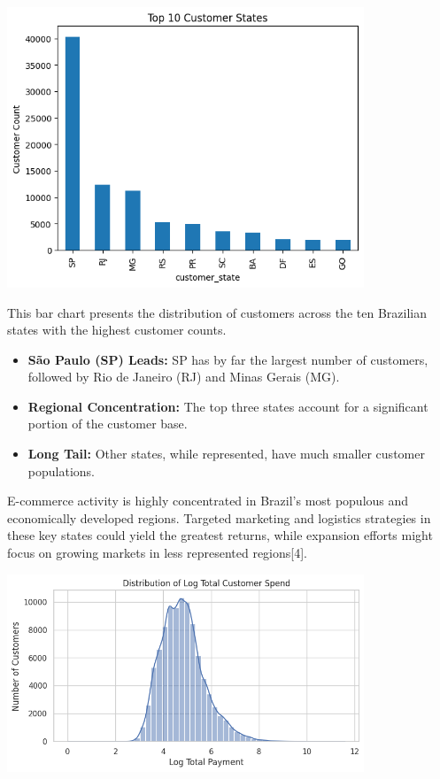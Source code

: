 \documentclass[a4paper]{article}
\begin{document}
\begin{multicols}{2}
\noindent
\begin{minipage}{\columnwidth}
\centering
\includegraphics[width=0.8\textwidth]{Top 10 Customer States.png}
\label{fig:top_10_customer_states}
\end{minipage}

This bar chart presents the distribution of customers across the ten Brazilian states with the highest customer counts.

\begin{itemize}
    \item \textbf{São Paulo (SP) Leads:} SP has by far the largest number of customers, followed by Rio de Janeiro (RJ) and Minas Gerais (MG).
    \item \textbf{Regional Concentration:} The top three states account for a significant portion of the customer base.
    \item \textbf{Long Tail:} Other states, while represented, have much smaller customer populations.
\end{itemize}

E-commerce activity is highly concentrated in Brazil’s most populous and economically developed regions. Targeted marketing and logistics strategies in these key states could yield the greatest returns, while expansion efforts might focus on growing markets in less represented regions[4].




\noindent
\begin{minipage}{\columnwidth}
\centering
\includegraphics[width=0.8\textwidth]{Distribution of Log Total Customer Spend.png}
\label{fig:log_total_spend}
\end{minipage}


\end{multicols}
\end{document}
